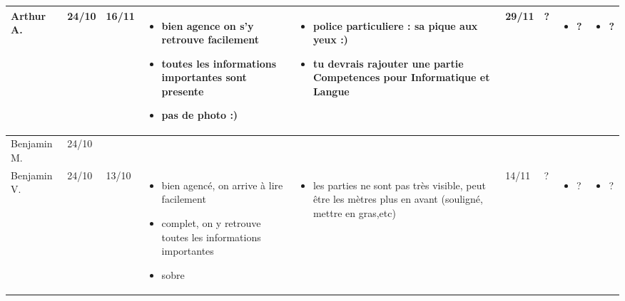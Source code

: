\documentclass[a4paper,11pt]{article}
\begin{document}
\begin{landscape}
\begin{longtable}{|l|l|l|p{4cm}|p{4cm}|l|l|p{4cm}|p{4cm}|}
    Arthur A. & 24/10 & 16/11 %
			  & \begin{itemize}
				\item bien agence on s'y retrouve facilement
				\item toutes les informations importantes sont presente
				\item pas de photo :)
				\end{itemize}
			  & \begin{itemize}
				\item police particuliere : sa pique aux yeux :)
				\item tu devrais rajouter une partie Competences pour Informatique et Langue
				\end{itemize}
			  & 29/11 & ?
			  & \begin{itemize}
				\item ?
				\end{itemize}
			  & \begin{itemize}
				\item ?
				\end{itemize} \\ \hline

    Benjamin M. & 24/10 & & & & & & & \\ \hline %
    
    Benjamin V. & 24/10 & 13/10 %
    			& \begin{itemize}
				  \item bien agencé, on arrive à lire facilement
				  \item complet, on y retrouve toutes les informations importantes
				  \item sobre
				  \end{itemize}
				& \begin{itemize}
				  \item les parties ne sont pas très visible, peut être les mètres plus en avant (souligné, mettre en gras,etc)
			      \end{itemize} 
    			& 14/11 & ?
    			& \begin{itemize}
				  \item ?
				  \end{itemize}
			    & \begin{itemize}
				  \item ?
				  \end{itemize} \\ \hline 


\end{longtable}
\end{landscape}
\end{document}
